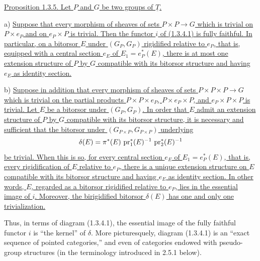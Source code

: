 
\underline{Proposition 1.3.5. Let $P$ and $G$ be two groups of
$\underline T$.}

a) \underline{Suppose that every morphism of sheaves of sets
$P\times P\longrightarrow G$ which is trivial on $P\times e_P$ and on
$e_P\times P$ is trivial. Then the functor $i$ of (1.3.4.1) is fully
faithful. In particular, on a bitorsor $E$ under $(G_P,G_P)$ rigidified
relative to $e_P$, that is, equipped with a central section $e_E$ of
$E_1=e_P^*(E)$, there is at most one extension structure of $P$ by $G$
compatible with its bitorsor structure and having $e_E$ as identity
section.}

b) \underline{Suppose in addition that every morphism of sheaves of
sets $P\times P\times P\longrightarrow G$ which is trivial on the
partial products $P\times P\times e_P$, $P\times e_P\times P$, and
$e_P\times P\times P$ is trivial. Let $E$ be a bitorsor under
$(G_P,G_P)$. In order that $E$ admit an extension structure of $P$ by
$G$ compatible with its bitorsor structure, it is necessary and
sufficient that the bitorsor under
$(G_{P\times P},G_{P\times P})$ underlying}
\[
 \delta(E)=\pi^*(E)\,\operatorname{pr}_1^*(E)^{-1}\,\operatorname{pr}_2^*(E)^{-1}
\]
\underline{be trivial. When this is so, for every central section
$e_E$ of $E_1=e_P^*(E)$, that is, every rigidification of $E$ relative
to $e_P$, there is a unique extension structure on $E$ compatible with
its bitorsor structure and having $e_E$ as identity section. In other
words, $E$, regarded as a bitorsor rigidified relative to $e_P$, lies
in the essential image of $i$. Moreover, the birigidified bitorsor
$\delta(E)$ has one and only one trivialization.}


Thus, in terms of diagram (1.3.4.1), the essential image of the fully
faithful functor $i$ is ``the kernel'' of $\delta$. More picturesquely,
diagram (1.3.4.1) is an ``exact sequence of pointed categories,'' and
even of categories endowed with pseudo-group structures (in the
terminology introduced in 2.5.1 below).

